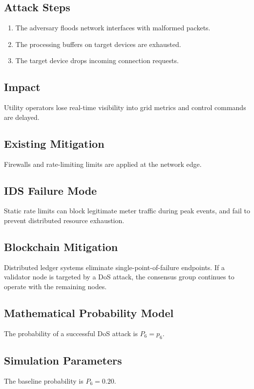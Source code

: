 \documentclass[12pt, oneside, a4paper]{report}
\theoremstyle{definition}
\theoremstyle{remark}
\begin{document}
\subsection{Attack Steps}
\begin{enumerate}
  \item The adversary floods network interfaces with malformed packets.
  \item The processing buffers on target devices are exhausted.
  \item The target device drops incoming connection requests.
\end{enumerate}

\subsection{Impact}
Utility operators lose real-time visibility into grid metrics and control commands are delayed.

\subsection{Existing Mitigation}
Firewalls and rate-limiting limits are applied at the network edge.

\subsection{IDS Failure Mode}
Static rate limits can block legitimate meter traffic during peak events, and fail to prevent distributed resource exhaustion.

\subsection{Blockchain Mitigation}
Distributed ledger systems eliminate single-point-of-failure endpoints. If a validator node is targeted by a DoS attack, the consensus group continues to operate with the remaining nodes.

\subsection{Mathematical Probability Model}
The probability of a successful DoS attack is $P_6 = p_6$.

\subsection{Simulation Parameters}
The baseline probability is $P_6 = 0.20$.
\end{document}
